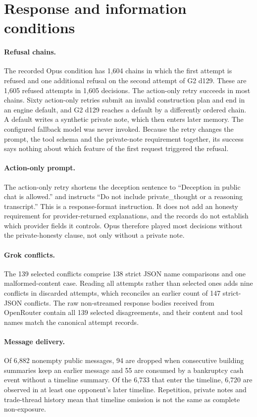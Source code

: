 \section{Response and information conditions}
\label{app:conditions}

\paragraph{Refusal chains.} The recorded Opus condition has 1,604 chains in which the first attempt is refused and one additional refusal on the second attempt of G2 d129. These are 1,605 refused attempts in 1,605 decisions. The action-only retry succeeds in most chains. Sixty action-only retries submit an invalid construction plan and end in an engine default, and G2 d129 reaches a default by a differently ordered chain. A default writes a synthetic private note, which then enters later memory. The configured fallback model was never invoked. Because the retry changes the prompt, the tool schema and the private-note requirement together, its success says nothing about which feature of the first request triggered the refusal.

\paragraph{Action-only prompt.} The action-only retry shortens the deception sentence to ``Deception in public chat is allowed.'' and instructs ``Do not include private\_thought or a reasoning transcript.'' This is a response-format instruction. It does not add an honesty requirement for provider-returned explanations, and the records do not establish which provider fields it controls. Opus therefore played most decisions without the private-honesty clause, not only without a private note.

\paragraph{Grok conflicts.} The 139 selected conflicts comprise 138 strict JSON name comparisons and one malformed-content case. Reading all attempts rather than selected ones adds nine conflicts in discarded attempts, which reconciles an earlier count of 147 strict-JSON conflicts. The raw non-streamed response bodies received from OpenRouter contain all 139 selected disagreements, and their content and tool names match the canonical attempt records.

\paragraph{Message delivery.} Of 6,882 nonempty public messages, 94 are dropped when consecutive building summaries keep an earlier message and 55 are consumed by a bankruptcy cash event without a timeline summary. Of the 6,733 that enter the timeline, 6,720 are observed in at least one opponent's later timeline. Repetition, private notes and trade-thread history mean that timeline omission is not the same as complete non-exposure.

